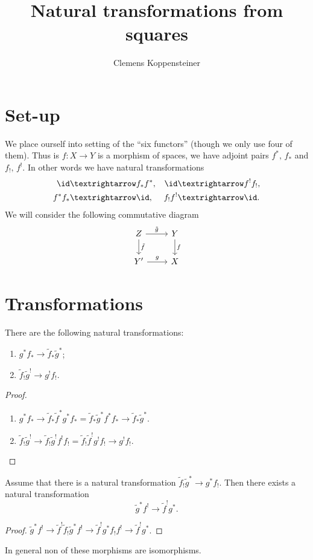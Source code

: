 \documentclass[english,no-theorem-numbers]{short-notes}
\title{Natural transformations from squares}
\author{Clemens Koppensteiner}
\begin{document}
\maketitle

\section*{Set-up}

We place ourself into setting of the \enquote{six functors} (though we only use four of them).
Thus is $f\colon X → Y$ is a morphism of spaces, we have adjoint pairs $f^*,\, f_*$ and $f_!,\, f^!$.
In other words we have natural transformations
\begin{align*}
    \id & → f_*f^*, & \id & → f^!f_!, \\
    f^*f_* & → \id, & f_!f^! & → \id.
\end{align*}
We will consider the following commutative diagram
\[
    \begin{tikzcd}
        Z \arrow{r}{\tilde g} \arrow{d}{\tilde f} & Y \arrow{d}{f} \\
        Y' \arrow{r}{g} & X
    \end{tikzcd}
\]

\section*{Transformations}

\begin{Thm}
    There are the following natural transformations:
    \begin{enumerate}
        \item $g^*f_* → \tilde{f}_*\tilde{g}^*$;
        \item $\tilde{f}_!\tilde{g}^! → g^!f_!$.
    \end{enumerate}
\end{Thm}

\begin{proof}\leavevmode
    \begin{enumerate}
        \item $g^*f_* → \tilde{f}_*\tilde{f}^*g^*f_* = \tilde{f}_*\tilde{g}^*f^*f_* → \tilde{f}_*\tilde{g}^*$.
        \item $\tilde{f}_!\tilde{g}^! → \tilde{f}_!\tilde{g}^!f^!f_! = \tilde{f}_!\tilde{f}^!g^!f_! →  g^!f_!$.
            \qedhere
    \end{enumerate}
\end{proof}

\begin{Thm}
    Assume that there is a natural transformation $\tilde{f}_!\tilde{g}^* → g^*f_!$.
    Then there exists a natural transformation
    \[
        \tilde{g}^*f^! → \tilde{f}^!g^*.
    \]
\end{Thm}

\begin{proof}
    $\tilde{g}^*f^! → \tilde{f}^!\tilde{f}_!\tilde{g}^*f^! → \tilde{f}^!g^*f_!f^! → \tilde{f}^!g^*$.
\end{proof}

\begin{Rem}
    In general non of these morphisms are isomorphisms.
\end{Rem}
\end{document}
